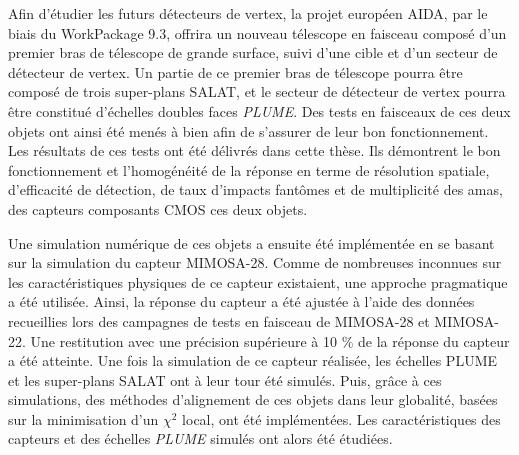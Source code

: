 \medskip

Afin d'\'etudier les futurs d\'etecteurs de vertex, la projet europ\'een AIDA, par le biais du WorkPackage 9.3, offrira un nouveau télescope en faisceau compos\'e d'un premier bras de télescope de grande surface, suivi d'une cible et d'un secteur de détecteur de vertex. Un partie de ce premier bras de télescope pourra \^etre compos\'e de trois super-plans SALAT, et le secteur de d\'etecteur de vertex pourra \^etre constitu\'e d'échelles doubles faces \textit{PLUME}. Des tests en faisceaux de ces deux objets ont ainsi \'et\'e men\'es \`a bien afin de s'assurer de leur bon fonctionnement. Les r\'esultats de ces tests ont \'et\'e d\'elivr\'es dans cette th\`ese. Ils d\'emontrent le bon fonctionnement et l'homog\'en\'eit\'e de la r\'eponse en terme de r\'esolution spatiale, d'efficacit\'e de d\'etection, de taux d'impacts fant\^omes et de multiplicit\'e des amas, des capteurs composants CMOS ces deux objets. 

\medskip

Une simulation num\'erique de ces objets a ensuite \'et\'e impl\'ement\'ee en se basant sur la simulation du capteur MIMOSA-28. Comme de nombreuses inconnues sur les caract\'eristiques physiques de ce capteur existaient, une approche pragmatique a \'et\'e utilis\'ee. Ainsi, la r\'eponse du capteur a \'et\'e ajust\'ee \`a l'aide des donn\'ees recueillies lors des campagnes de tests en faisceau de MIMOSA-28 et MIMOSA-22. Une restitution avec une pr\'ecision sup\'erieure \`a 10 $\%$ de la r\'eponse du capteur a \'et\'e atteinte. Une fois la simulation de ce capteur r\'ealis\'ee, les \'echelles PLUME et les super-plans SALAT ont \`a leur tour \'et\'e simul\'es. Puis, grâce \`a ces simulations, des m\'ethodes d'alignement de ces objets dans leur globalit\'e, bas\'ees sur la minimisation d'un $\chi^2$ local, ont \'et\'e impl\'ement\'ees. Les caract\'eristiques des capteurs et des \'echelles \textit{PLUME} simul\'es ont alors \'et\'e \'etudi\'ees.

\medskip

